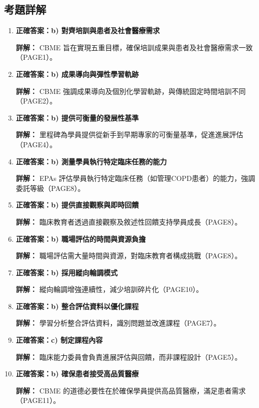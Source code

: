 \documentclass[12pt,a4paper]{article}
\begin{document}
\newpage
\subsection{考題詳解}

\begin{enumerate}
    \item \textbf{正確答案：b) 對齊培訓與患者及社會醫療需求}

    \textbf{詳解：} CBME 旨在實現五重目標，確保培訓成果與患者及社會醫療需求一致（PAGE1）。

    \item \textbf{正確答案：b) 成果導向與彈性學習軌跡}

    \textbf{詳解：} CBME 強調成果導向及個別化學習軌跡，與傳統固定時間培訓不同（PAGE2）。

    \item \textbf{正確答案：b) 提供可衡量的發展性基準}

    \textbf{詳解：} 里程碑為學員提供從新手到早期專家的可衡量基準，促進進展評估（PAGE4）。

    \item \textbf{正確答案：b) 測量學員執行特定臨床任務的能力}

    \textbf{詳解：} EPAs 評估學員執行特定臨床任務（如管理COPD患者）的能力，強調委託等級（PAGE8）。

    \item \textbf{正確答案：b) 提供直接觀察與即時回饋}

    \textbf{詳解：} 臨床教育者透過直接觀察及敘述性回饋支持學員成長（PAGE8）。

    \item \textbf{正確答案：b) 職場評估的時間與資源負擔}

    \textbf{詳解：} 職場評估需大量時間與資源，對臨床教育者構成挑戰（PAGE8）。

    \item \textbf{正確答案：b) 採用縱向輪調模式}

    \textbf{詳解：} 縱向輪調增強連續性，減少培訓碎片化（PAGE10）。

    \item \textbf{正確答案：b) 整合評估資料以優化課程}

    \textbf{詳解：} 學習分析整合評估資料，識別問題並改進課程（PAGE7）。

    \item \textbf{正確答案：c) 制定課程內容}

    \textbf{詳解：} 臨床能力委員會負責進展評估與回饋，而非課程設計（PAGE5）。

    \item \textbf{正確答案：b) 確保患者接受高品質醫療}

    \textbf{詳解：} CBME 的道德必要性在於確保學員提供高品質醫療，滿足患者需求（PAGE11）。
\end{enumerate}
\end{document}
